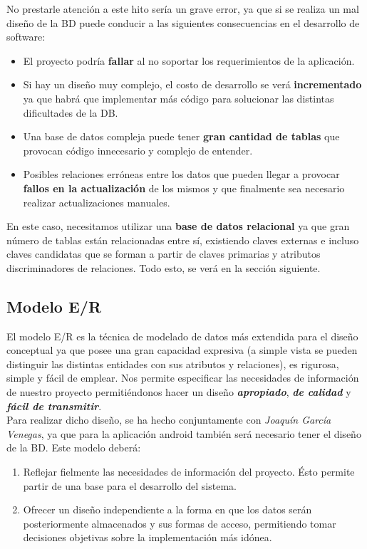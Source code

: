 No prestarle atención a este hito sería un grave error, ya que si se realiza un mal diseño
de la BD puede conducir a las siguientes consecuencias en el desarrollo de software:

    \begin{itemize}
        \item El proyecto podría \textbf{fallar} al no soportar los requerimientos de la
        aplicación.
        \item Si hay un diseño muy complejo, el costo de desarrollo se verá
        \textbf{incrementado} ya que habrá que implementar más código para solucionar las
        distintas dificultades de la DB.
        \item Una base de datos compleja puede tener \textbf{gran cantidad de tablas} que 
        provocan código innecesario y complejo de entender.
        \item Posibles relaciones erróneas entre los datos que pueden llegar a provocar
        \textbf{fallos en la actualización} de los mismos y que finalmente sea necesario realizar
        actualizaciones manuales.
    \end{itemize}

En este caso, necesitamos utilizar una \textbf{base de datos relacional} ya que gran número
de tablas están relacionadas entre sí, existiendo claves externas e incluso claves
candidatas que se forman a partir de claves primarias y atributos discriminadores de
relaciones. Todo esto, se verá en la sección siguiente.

    \subsection{Modelo E/R}
    El modelo E/R es la técnica de modelado de datos más extendida para el diseño
    conceptual ya que posee una gran capacidad expresiva (a simple vista se pueden
    distinguir las distintas entidades con sus atributos y relaciones), es rigurosa, simple
    y fácil de emplear. Nos permite especificar las necesidades de información de nuestro
    proyecto permitiéndonos hacer un diseño \textbf{\textit{apropiado}},
    \textbf{\textit{de calidad}} y \textbf{\textit{fácil de transmitir}}.\\

    Para realizar dicho diseño, se ha hecho conjuntamente con \textit{Joaquín García 
    Venegas}, ya que para la aplicación android también será necesario tener el diseño de la
    BD. Este modelo deberá:

        \begin{enumerate}
            \item Reflejar fielmente las necesidades de información del proyecto. Ésto permite
            partir de una base para el desarrollo del sistema.
            \item Ofrecer un diseño independiente a la forma en que los datos serán
            posteriormente almacenados y sus formas de acceso, permitiendo tomar decisiones
            objetivas sobre la implementación más idónea.
        \end{enumerate}

